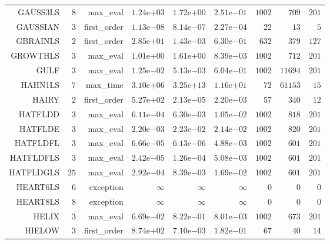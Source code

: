 \begin{longtable}{rrrrrrrrr}
GAUSS3LS & \(     8\) & max\_eval & \( 1.24\)e\(+03\) & \( 1.72\)e\(+00\) & \( 2.51\)e\(-01\) & \(  1002\) & \(   709\) & \(   201\) \\
GAUSSIAN & \(     3\) & first\_order & \( 1.13\)e\(-08\) & \( 8.14\)e\(-07\) & \( 2.27\)e\(-04\) & \(    22\) & \(    13\) & \(     5\) \\
GBRAINLS & \(     2\) & first\_order & \( 2.85\)e\(+01\) & \( 1.43\)e\(-03\) & \( 6.30\)e\(-01\) & \(   632\) & \(   379\) & \(   127\) \\
GROWTHLS & \(     3\) & max\_eval & \( 1.01\)e\(+00\) & \( 1.61\)e\(+00\) & \( 8.39\)e\(-03\) & \(  1002\) & \(   712\) & \(   201\) \\
GULF & \(     3\) & max\_eval & \( 1.25\)e\(-02\) & \( 5.13\)e\(-03\) & \( 6.04\)e\(-01\) & \(  1002\) & \( 11694\) & \(   201\) \\
HAHN1LS & \(     7\) & max\_time & \( 3.10\)e\(+06\) & \( 3.25\)e\(+13\) & \( 1.16\)e\(+01\) & \(    72\) & \( 61153\) & \(    15\) \\
HAIRY & \(     2\) & first\_order & \( 5.27\)e\(+02\) & \( 2.13\)e\(-05\) & \( 2.20\)e\(-03\) & \(    57\) & \(   340\) & \(    12\) \\
HATFLDD & \(     3\) & max\_eval & \( 6.11\)e\(-04\) & \( 6.30\)e\(-03\) & \( 1.05\)e\(-02\) & \(  1002\) & \(   818\) & \(   201\) \\
HATFLDE & \(     3\) & max\_eval & \( 2.20\)e\(-03\) & \( 2.23\)e\(-02\) & \( 2.14\)e\(-02\) & \(  1002\) & \(   820\) & \(   201\) \\
HATFLDFL & \(     3\) & max\_eval & \( 6.66\)e\(-05\) & \( 6.13\)e\(-06\) & \( 4.88\)e\(-03\) & \(  1002\) & \(   601\) & \(   201\) \\
HATFLDFLS & \(     3\) & max\_eval & \( 2.42\)e\(-05\) & \( 1.26\)e\(-04\) & \( 5.08\)e\(-03\) & \(  1002\) & \(   601\) & \(   201\) \\
HATFLDGLS & \(    25\) & max\_eval & \( 2.92\)e\(-04\) & \( 8.39\)e\(-03\) & \( 1.69\)e\(-02\) & \(  1002\) & \(   601\) & \(   201\) \\
HEART6LS & \(     6\) & exception & \(\infty\) & \(\infty\) & \(\infty\) & \(     0\) & \(     0\) & \(     0\) \\
HEART8LS & \(     8\) & exception & \(\infty\) & \(\infty\) & \(\infty\) & \(     0\) & \(     0\) & \(     0\) \\
HELIX & \(     3\) & max\_eval & \( 6.69\)e\(-02\) & \( 8.22\)e\(-01\) & \( 8.01\)e\(-03\) & \(  1002\) & \(   673\) & \(   201\) \\
HIELOW & \(     3\) & first\_order & \( 8.74\)e\(+02\) & \( 7.10\)e\(-03\) & \( 1.82\)e\(-01\) & \(    67\) & \(    40\) & \(    14\) \\

\end{longtable}
